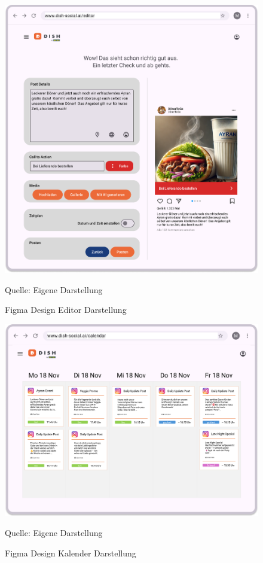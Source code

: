 \begin{figure}[htbp]
    \centering
    \includegraphics[width=\textwidth]{abbildungen/figma/Editor}
    \caption[]{Figma Design Editor Darstellung}
    \label{fig:editor-page}
    \raggedright Quelle: Eigene Darstellung
\end{figure}
\newpage

\begin{figure}[htbp]
    \centering
    \includegraphics[width=\textwidth]{abbildungen/figma/Kalender}
    \caption[]{Figma Design Kalender Darstellung}
    \label{fig:calendar-page}
    \raggedright Quelle: Eigene Darstellung
\end{figure}

